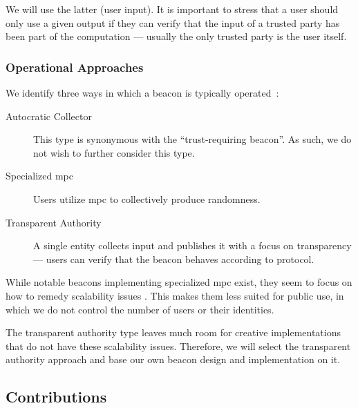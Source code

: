 We will use the latter (user input).
It is important to stress that a user should only use a given output if they can verify that the input of a trusted party has been part of the computation --- usually the only trusted party is the user itself.

\subsubsection{Operational Approaches}
We identify three ways in which a beacon is typically operated~:

\begin{description}
    \item[Autocratic Collector] This type is synonymous with the \enquote{trust-requiring beacon}. As such, we do not wish to further consider this type.

    \item [Specialized \acrshort{mpc}] Users utilize \acrfull{mpc} to collectively produce randomness.

    \item [Transparent Authority] A single entity collects input and publishes it with a focus on transparency --- users can verify that the beacon behaves according to protocol.

\end{description}

While notable beacons implementing specialized \acrshort{mpc} exist, they seem to focus on how to remedy scalability issues . This makes them less suited for public use, in which we do not control the number of users or their identities.

The transparent authority type leaves much room for creative implementations that do not have these scalability issues. Therefore, we will select the transparent authority approach and base our own beacon design and implementation on it.

\subsection{Contributions}
